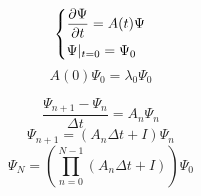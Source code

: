 \documentclass[a4paper,12pt]{article}
\begin{document}
\[
\begin{dcases}
    \frac{\partial \Psi}{\partial t} = A(t) \Psi\\
    \Psi|_{t = 0} = \Psi_{0}
\end{dcases}
\]
\[A(0)\Psi_0 = \lambda_0\Psi_0\]


\[
\frac{\Psi_{n+1} - \Psi_{n}}{\Delta t} = A_{n}\Psi_{n}
\]
\[
\Psi_{n+1} = (A_{n}\Delta t + I)\Psi_{n}
\]
\[
\Psi_{N} = \left(\prod_{n = 0}^{N-1} (A_{n}\Delta t + I)\right)\Psi_{0}
\]
 
\end{document}
